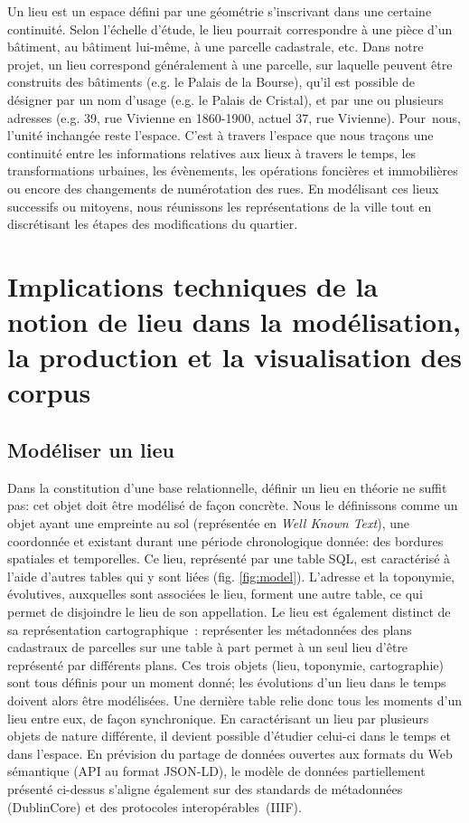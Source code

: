 \documentclass[11pt,french]{article}
\begin{document}
Un lieu est un espace défini par une géométrie s’inscrivant dans une certaine continuité. Selon l’échelle d’étude, le lieu pourrait correspondre à une pièce d’un bâtiment, au bâtiment lui-même, à une parcelle cadastrale, etc. Dans notre projet, un lieu correspond généralement à une parcelle, sur laquelle peuvent être construits des bâtiments (e.g. le Palais de la Bourse), qu’il est possible de désigner par un nom d’usage (e.g. le Palais de Cristal), et par une ou plusieurs adresses (e.g. 39, rue Vivienne en 1860-1900, actuel 37, rue Vivienne). Pour nous, l’unité inchangée reste l’espace. C’est à travers l'espace que nous traçons une continuité entre les informations relatives aux lieux à travers le temps, les transformations urbaines, les évènements, les opérations foncières et immobilières ou encore des changements de numérotation des rues. En modélisant ces lieux successifs ou mitoyens, nous réunissons les représentations de la ville tout en discrétisant les étapes des modifications du quartier.

\section{Implications techniques de la notion de lieu dans la modélisation, la production et la visualisation des corpus}
\label{sec:III}
\subsection{Modéliser un lieu}
Dans la constitution d’une base relationnelle, définir un lieu en théorie ne suffit pas: cet objet doit être modélisé de façon concrète. Nous le définissons comme un objet ayant une empreinte au sol (représentée en \textit{Well Known Text}), une coordonnée et existant durant une période chronologique donnée: des bordures spatiales et temporelles. Ce lieu, représenté par une table SQL, est caractérisé à l’aide d’autres tables qui y sont liées (fig. \ref{fig:model}). L’adresse et la toponymie, évolutives, auxquelles sont associées le lieu, forment une autre table, ce qui permet de disjoindre le lieu de son appellation. Le lieu est également distinct de sa représentation cartographique : représenter les métadonnées des plans cadastraux de parcelles sur une table à part permet à un seul lieu d’être représenté par différents plans. Ces trois objets (lieu, toponymie, cartographie) sont tous définis pour un moment donné; les évolutions d’un lieu dans le temps doivent alors être modélisées. Une dernière table relie donc tous les moments d’un lieu entre eux, de façon synchronique. En caractérisant un lieu par plusieurs objets de nature différente, il devient possible d’étudier celui-ci dans le temps et dans l’espace. En prévision du partage de données ouvertes aux formats du Web sémantique (API au format JSON-LD), le modèle de données partiellement présenté ci-dessus s’aligne également sur des standards de métadonnées (DublinCore) et des protocoles interopérables (IIIF).
\end{document}
